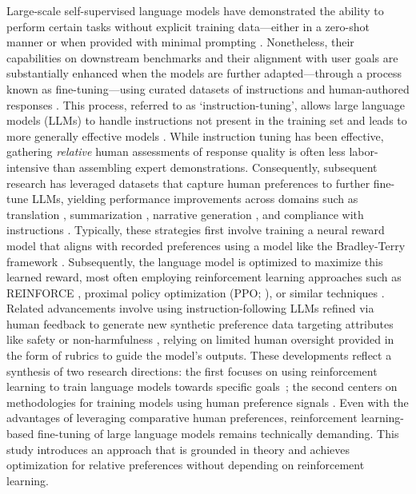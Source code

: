 Large-scale self-supervised language models have demonstrated the ability to perform certain tasks without explicit training data—either in a zero-shot manner \citep{radford2019language} or when provided with minimal prompting \citep{gpt3,megatron,chowdhery2022palm}. Nonetheless, their capabilities on downstream benchmarks and their alignment with user goals are substantially enhanced when the models are further adapted—through a process known as fine-tuning—using curated datasets of instructions and human-authored responses \citep{mishra-etal-2022-cross,sanh2022multitask,chung2022scaling,thoppilan2022lamda}. This process, referred to as `instruction-tuning', allows large language models (LLMs) to handle instructions not present in the training set and leads to more generally effective models \citep{chung2022scaling}. While instruction tuning has been effective, gathering \textit{relative} human assessments of response quality is often less labor-intensive than assembling expert demonstrations. Consequently, subsequent research has leveraged datasets that capture human preferences to further fine-tune LLMs, yielding performance improvements across domains such as translation \citep{kreutzer-etal-2018-reliability}, summarization \citep{stiennon2022learning,ziegler2020finetuning}, narrative generation \citep{ziegler2020finetuning}, and compliance with instructions \citep{ouyang2022training,ramamurthy2023is}. Typically, these strategies first involve training a neural reward model that aligns with recorded preferences using a model like the Bradley-Terry framework \citep{bradley1952rankanalysis}. Subsequently, the language model is optimized to maximize this learned reward, most often employing reinforcement learning approaches such as REINFORCE \citep{williams1992reinforce}, proximal policy optimization (PPO; \cite{schulman2017proximal}), or similar techniques \citep{ramamurthy2023is}. Related advancements involve using instruction-following LLMs refined via human feedback to generate new synthetic preference data targeting attributes like safety or non-harmfulness \citep{bai2022constitutional}, relying on limited human oversight provided in the form of rubrics to guide the model's outputs. These developments reflect a synthesis of two research directions: the first focuses on using reinforcement learning to train language models towards specific goals~\citep{Ranzato2015SequenceLT,paulus2018a,wu2018learning}; the second centers on methodologies for training models using human preference signals \citep{christiano2017deep,kupcsik2018learning}. Even with the advantages of leveraging comparative human preferences, reinforcement learning-based fine-tuning of large language models remains technically demanding. This study introduces an approach that is grounded in theory and achieves optimization for relative preferences without depending on reinforcement learning.

